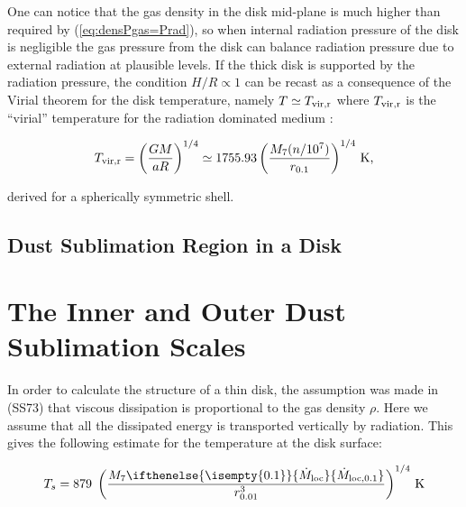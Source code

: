 \documentclass[12pt,english,preprint]{aastex}
\newcommand{\su}[2]{#1_{\rm #2}}
\newcommand{\mdt}[1][]{ 
  \ifthenelse{\isempty{#1}}
  {\dot{M}_{\rm loc}}
  { {\dot M}_{\rm{loc},{#1}} } 
  } %
\newcommand{\mdtcr}{\su{\dot{M}}{loc,cr} }
\begin{document}

One can notice that
the gas density in the disk mid-plane is much higher than required by 
(\ref{eq:densPgas=Prad}), so when internal radiation pressure
of the disk is negligible the gas pressure from the disk 
can balance radiation pressure due to external radiation at plausible levels.
If the thick disk is supported by the radiation pressure, the condition
$H/R\propto1$ can be recast as a consequence of the Virial theorem
for the disk temperature, namely $T\simeq T_{{\rm vir,r}}$ where
$T_{{\rm vir,r}}$ is the ``virial'' temperature for the radiation
dominated medium \citep{Dorodnitsyn11a}:

\begin{equation}
T_{{\rm vir,r}}=\left(\frac{GM}{a R}\right)^{1/4}
\simeq 1755.93 \left(\frac{M_{7}(n/10^7)}{r_{0.1}}\right)^{1/4}{\rm \,K}\mbox{,}
\label{eq:TvirRad}
\end{equation}

\noindent derived for a spherically symmetric shell. 


\subsection{Dust Sublimation Region in a Disk}\label{sec:DustSubRegIndisk}



\section{The Inner and Outer Dust Sublimation Scales}

In order to calculate the structure of a thin disk,  the
assumption was made in (SS73) that viscous dissipation is proportional
to the gas density $\rho$.  Here we assume that all the dissipated energy is transported vertically
by radiation. This gives the following estimate for the temperature
at the disk surface:

\begin{equation}
T_s=879\;\left(\frac{M_{7}\mdt[0.1]}{r_{0.01}^{3}}\right)^{1/4}\text{\,K}\label{eq:Teff}
\end{equation}
\end{document}
